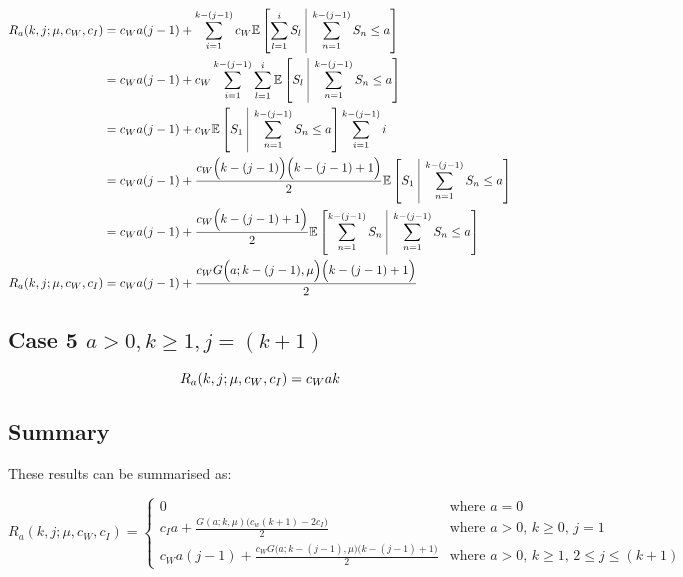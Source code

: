 \documentclass{article}
\begin{document}
\begin{align*}
	R_{a} (k, j; \mu, c_{W}, c_{I}) & = c_{W} a (j - 1) + \sum_{i = 1}^{k - (j - 1)} c_{W} \mathbb{E} \left[ \sum_{l = 1}^{i} S_{l} \ \vline \ \sum_{n = 1}^{k - (j - 1)} S_{n} \leq a \right] \\
	& = c_{W} a (j - 1) + c_{W} \sum_{i = 1}^{k - (j - 1)} \sum_{l = 1}^{i} \mathbb{E} \left[ S_{l} \ \vline \ \sum_{n = 1}^{k - (j - 1)} S_{n} \leq a \right] \\
	& = c_{W} a (j - 1) + c_{W} \mathbb{E} \left[ S_{1} \ \vline \ \sum_{n = 1}^{k - (j - 1)} S_{n} \leq a \right] \sum_{i = 1}^{k - (j - 1)} i \\
	& = c_{W} a (j - 1) + \frac{c_{W} \Big( k - (j - 1) \Big) \Big( k - (j - 1) + 1 \Big)}{2} \mathbb{E} \left[ S_{1} \ \vline \ \sum_{n = 1}^{k - (j - 1)} S_{n} \leq a \right] \\
	& = c_{W} a (j - 1) + \frac{c_{W} \Big( k - (j - 1) + 1 \Big)}{2} \mathbb{E} \left[ \sum_{n = 1}^{k - (j - 1)} S_{n} \ \vline \ \sum_{n = 1}^{k - (j - 1)} S_{n} \leq a \right] \\
	R_{a} (k, j; \mu, c_{W}, c_{I}) & = c_{W} a (j - 1) + \frac{c_{W} G \Big( a; k - (j - 1), \mu \Big) \Big( k - (j - 1) + 1 \Big)}{2} \\
\end{align*}

\subsection{Case 5 $a > 0, k \geq 1, j = (k + 1)$}

\begin{equation*}
	R_{a} (k, j; \mu, c_{W}, c_{I}) = c_{W} a k \\
\end{equation*}

\subsection{Summary}

These results can be summarised as:

\begin{equation}
	R_{a} (k, j; \mu, c_{W}, c_{I}) = \begin{cases} 0 & \text{where $a = 0$} \\
						c_{I} a + \frac{G (a; k, \mu) \big( c_{w} (k + 1) - 2 c_{I} \big)}{2} & \text{where $a > 0$, $k \geq 0$, $j = 1$} \\
						c_{W} a (j - 1) + \frac{c_{W} G \big( a; k - (j - 1), \mu \big) \big( k - (j - 1) + 1 \big)}{2} & \text{where $a > 0$, $k \geq 1$, $2 \leq j \leq (k + 1)$} \end{cases}
\end{equation}
\end{document}
